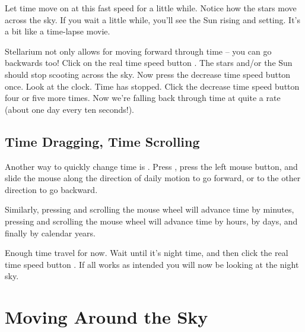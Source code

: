 Let time move on at this fast speed for a little while. Notice how the
stars move across the sky. If you wait a little while, you'll see the
Sun rising and setting. It's a bit like a time-lapse movie. 

Stellarium not only allows for moving forward through time -- you can
go backwards too! Click on the real time speed button
.  The stars and/or the
Sun should stop scooting across the sky. Now press the decrease time
speed button  once. Look
at the clock. Time has stopped. Click the decrease time speed button
four or five more times. Now we're falling back through time at quite
a rate (about one day every ten seconds!).

\subsection*{Time Dragging, Time Scrolling}
\label{sec:tour:timeDrag}

Another way to quickly change time is . Press
\keys{\ctrl}, press the left mouse button, and slide the mouse along the direction of daily motion to go forward, 
or to the other direction to go backward.

Similarly, pressing \keys{\ctrl} and scrolling the mouse wheel will 
advance time by minutes, pressing \keys{\ctrl+\shift} and 
scrolling the mouse wheel will advance time by hours, \keys{\ctrl+\Alt} by days, 
and finally \keys{\ctrl+\shift+\Alt} by calendar years.


Enough time travel for now. Wait until it's night time, and then click
the real time speed button .
If all works as intended you will now be looking at the night sky.

\section{Moving Around the Sky}
\label{sec:tour:moving}

